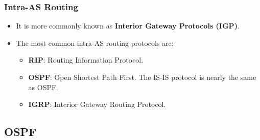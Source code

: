 \documentclass{article}
\begin{document}
\subsubsection{Intra-AS Routing}
\begin{itemize}
\item It is more commonly known as {\bf Interior Gateway Protocols (IGP)}.
\item The most common intra-AS routing protocols are:
\begin{itemize}
\item {\bf RIP}: Routing Information Protocol.
\item {\bf OSPF}: Open Shortest Path First. The IS-IS protocol is nearly the same as OSPF.
\item {\bf IGRP}: Interior Gateway Routing Protocol.
\end{itemize}
\end{itemize}

\subsection{OSPF}
\end{document}
